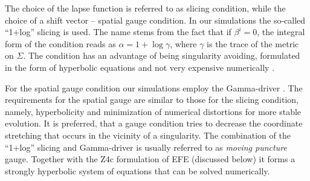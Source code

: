 %
The choice of the lapse function is referred to as slicing condition, 
while the choice of a shift vector -- spatial gauge condition. 
In our simulations the so-called ``1+log'' slicing is used. %
%
The name stems from the fact that if $\beta^i = 0$, 
the integral form of the condition reads as $\alpha = 1 + \log \gamma$, 
where $\gamma$ is the trace of the metric on $\Sigma$.
%
The condition has an advantage of being singularity avoiding, 
formulated in the form of hyperbolic equations and not very 
expensive numerically \citep{Alcubierre:2002kk}.


For the spatial gauge condition our simulations employ the Gamma-driver 
\citep{Alcubierre:2002kk,vanMeter:2006vi}.
The requirements for the spatial gauge are similar to those for 
the slicing condition, 
namely, hyperbolicity and minimization of numerical distortions for more stable evolution. 
It is preferred, that a gauge condition tries to decrease the coordinate stretching that occurs in the 
vicinity of a singularity. 
%
The combination of the ``1+log'' slicing and Gamma-driver 
is usually referred to as \textit{moving puncture} gauge.
Together with the Z4c formulation of \ac{EFE} (discussed below) 
it forms a strongly hyperbolic system of equations that can be solved numerically.
%


